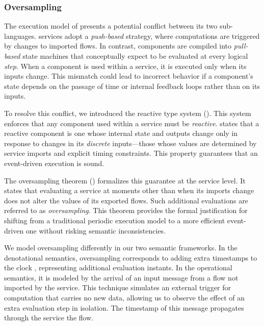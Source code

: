 \subsubsection{Oversampling}
\label{sec:semantics:grfrp:theorems:oversampling}

The execution model of \GRust presents a potential conflict between its two sub-languages. \GRFRP
services adopt a \emph{push-based} strategy, where computations are triggered by changes to imported
flows. In contrast, \GRSync components are compiled into \emph{pull-based} state machines that
conceptually expect to be evaluated at every logical \emph{step}. When a component is used within a
service, it is executed only when its inputs change. This mismatch could lead to incorrect behavior
if a component's state depends on the passage of time or internal feedback loops rather than on its
inputs.

To resolve this conflict, we introduced the reactive type system
(). This system enforces
that any component used within a service must be \emph{reactive}.
 states that a reactive component is one whose
internal state and outputs change only in response to changes in its \emph{discrete} inputs---those
whose values are determined by service imports and explicit timing constraints. This property
guarantees that an event-driven execution is sound.

The oversampling theorem () formalizes this
guarantee at the service level. It states that evaluating a service at moments other than when its
imports change does not alter the values of its exported flows. Such additional evaluations are
referred to as \emph{oversampling}. This theorem provides the formal justification for shifting from
a traditional periodic execution model to a more efficient event-driven one without risking semantic
inconsistencies.

We model oversampling differently in our two semantic frameworks. In the denotational semantics,
oversampling corresponds to adding extra timestamps to the clock \tck, representing additional
evaluation instants. In the operational semantics, it is modeled by the arrival of an input message
from a flow not imported by the service. This technique simulates an external trigger for
computation that carries no new data, allowing us to observe the effect of an extra evaluation step
in isolation. The timestamp of this message propagates through the service \via the \timeop flow.

